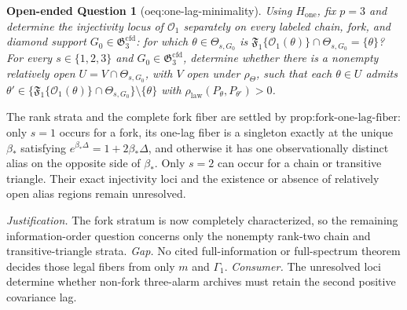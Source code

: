 \documentclass{article}
\newtheorem{openendedquestion}{Open-ended Question}
\begin{document}
\begin{openendedquestion}[oeq:one-lag-minimality]\label{oeq:one-lag-minimality}
Using \(H_{\mathrm{one}}\), fix \(p=3\) and determine the injectivity locus of \(\mathcal O_1\) separately on every labeled chain, fork, and diamond support \(G_0\in\mathfrak G_3^{\mathrm{cfd}}\): for which \(\theta\in\Theta_{s,G_0}\) is \(\mathfrak F_1\{\mathcal O_1(\theta)\}\cap\Theta_{s,G_0}=\{\theta\}\)? For every \(s\in\{1,2,3\}\) and \(G_0\in\mathfrak G_3^{\mathrm{cfd}}\), determine whether there is a nonempty relatively open \(U=V\cap\Theta_{s,G_0}\), with \(V\) open under \(\rho_{\Theta}\), such that each \(\theta\in U\) admits \(\theta'\in\{\mathfrak F_1\{\mathcal O_1(\theta)\}\cap\Theta_{s,G_0}\}\setminus\{\theta\}\) with \(\rho_{\mathrm{law}}(P_{\theta},P_{\theta'})>0\).
\end{openendedquestion}
The rank strata and the complete fork fiber are settled by \(\text{prop:fork-one-lag-fiber}\): only \(s=1\) occurs for a fork, its one-lag fiber is a singleton exactly at the unique \(\beta_*\) satisfying \(e^{\beta_*\Delta}=1+2\beta_*\Delta\), and otherwise it has one observationally distinct alias on the opposite side of \(\beta_*\).  Only \(s=2\) can occur for a chain or transitive triangle.  Their exact injectivity loci and the existence or absence of relatively open alias regions remain unresolved.
\par\smallskip\noindent \textit{Justification.} The fork stratum is now completely characterized, so the remaining information-order question concerns only the nonempty rank-two chain and transitive-triangle strata. \textit{Gap.} No cited full-information or full-spectrum theorem decides those legal fibers from only \(m\) and \(\Gamma_1\). \textit{Consumer.} The unresolved loci determine whether non-fork three-alarm archives must retain the second positive covariance lag.
\end{document}
